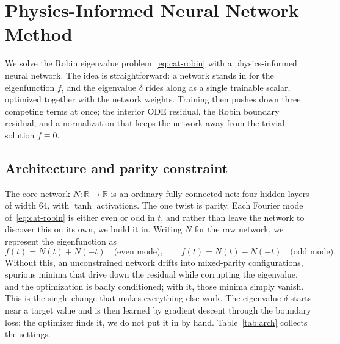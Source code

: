 \documentclass[11pt]{article}
\theoremstyle{definition}
\theoremstyle{plain}
\begin{document}
\section{Physics-Informed Neural Network Method}\label{sec:pinn}

We solve the Robin eigenvalue problem~\eqref{eq:cat-robin} with a physics-informed neural network. The idea is straightforward: a network stands in for the eigenfunction $f$, and the eigenvalue $\delta$ rides along as a single trainable scalar, optimized together with the network weights. Training then pushes down three competing terms at once; the interior ODE residual, the Robin boundary residual, and a normalization that keeps the network away from the trivial solution $f \equiv 0$.

\subsection{Architecture and parity constraint}

The core network $N \colon \mathbb{R} \to \mathbb{R}$ is an ordinary fully connected net: four hidden layers of width $64$, with $\tanh$ activations. The one twist is parity. Each Fourier mode of~\eqref{eq:cat-robin} is either even or odd in $t$, and rather than leave the network to discover this on its own, we build it in. Writing $N$ for the raw network, we represent the eigenfunction as
\begin{equation}\label{eq:parity}
	f(t) = N(t) + N(-t) \quad \text{(even mode)}, \qquad f(t) = N(t) - N(-t) \quad \text{(odd mode)}.
\end{equation}
Without this, an unconstrained network drifts into mixed-parity configurations, spurious minima that drive down the residual while corrupting the eigenvalue, and the optimization is badly conditioned; with it, those minima simply vanish. This is the single change that makes everything else work. The eigenvalue $\delta$ starts near a target value and is then learned by gradient descent through the boundary loss: the optimizer finds it, we do not put it in by hand. Table~\ref{tab:arch} collects the settings.
\end{document}
